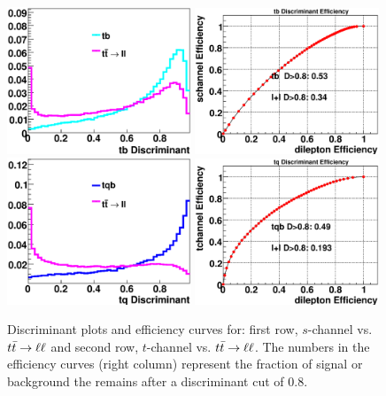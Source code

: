 \begin{figure}[!h!tbp]
\includegraphics[width=0.49\textwidth]
{eps/MatrixElement/performance/tb_Discriminant__schannel_dilepton}
\includegraphics[width=0.49\textwidth]
{eps/MatrixElement/performance/tb_Efficiency__schannel_dilepton}
\includegraphics[width=0.49\textwidth]
{eps/MatrixElement/performance/tq_Discriminant__tchannel_dilepton}
\includegraphics[width=0.49\textwidth]
{eps/MatrixElement/performance/tq_Efficiency__tchannel_dilepton}
\caption{Discriminant plots and efficiency curves for:
first row, $s$-channel vs. $\mbox{$t\bar{t}$} \rightarrow \ell \ell$ and second row, $t$-channel
vs. $\mbox{$t\bar{t}$} \rightarrow \ell \ell$. The numbers in the
efficiency curves (right column) represent the fraction of signal or
background the remains after a discriminant cut of 0.8.}
\label{disc_dilepton}
\end{figure}

